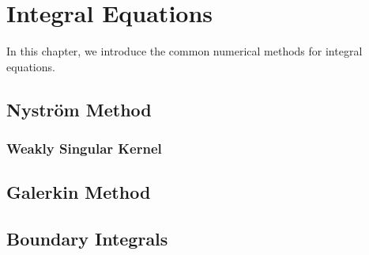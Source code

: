 \chapter{Integral Equations}
In this chapter, we introduce the common numerical methods for integral equations.  
\section{Nystr\"om Method}
\subsection{Weakly Singular Kernel}

\section{Galerkin Method}

\section{Boundary Integrals}